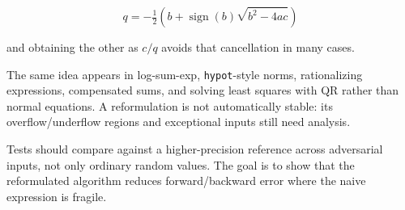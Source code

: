 \[
q=-\tfrac12\left(b+\operatorname{sign}(b)\sqrt{b^2-4ac}\right)
\]

and obtaining the other as \(c/q\) avoids that cancellation in many cases.

The same idea appears in log-sum-exp, \texttt{hypot}-style norms, rationalizing expressions, compensated sums, and solving least squares with QR rather than normal equations. A reformulation is not automatically stable: its overflow/underflow regions and exceptional inputs still need analysis.

Tests should compare against a higher-precision reference across adversarial inputs, not only ordinary random values. The goal is to show that the reformulated algorithm reduces forward/backward error where the naive expression is fragile.
